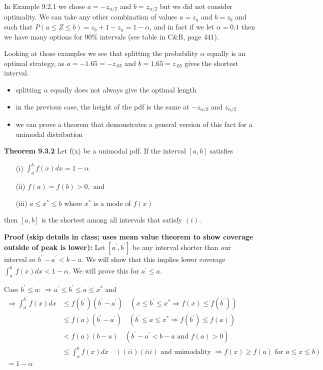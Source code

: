 \documentclass[11pt,]{article}
\begin{document}
In Example 9.2.1 we chose \(a = -z_{\alpha/2}\) and \(b = z_{\alpha/2}\)
but we did not consider optimality. We can take any other combination of
values \(a=z_{a}\) and \(b=z_{b}\) and such that
\(P(a \leq Z \leq b) = z_{b} + 1 - z_{a} = 1-\alpha\), and in fact if we
let \(\alpha = 0.1\) then we have many options for 90\% intervals (see
table in C\&B, page 441).

Looking at those examples we see that splitting the probability
\(\alpha\) equally is an optimal strategy, as \(a = -1.65 = -z_{.05}\)
and \(b=1.65 = z_{.05}\) gives the shortest interval.

\begin{itemize}
\item splitting $\alpha$ equally does not always give the optimal length
\item in the previous case, the height of the pdf is the same at $-z_{\alpha/2}$ and $z_{\alpha/2}$
\item we can prove a theorem that demonstrates a general version of this fact for a unimodal distribution
\end{itemize}

\noindent\textbf{Theorem 9.3.2} Let f(x) be a unimodal pdf. If the
interval \([a,b]\) satisfies

\begin{enumerate}
\item[(i)] $\int_{a}^{b} f(x) dx = 1-\alpha$
\item[(ii)] $f(a) = f(b) > 0,$ and
\item[(iii)] $a \leq x^* \leq b$ where $x^*$ is a mode of $f(x)$
\end{enumerate}

then \([a,b]\) is the shortest among all intervals that satisfy \((i)\).

\def\aprime{a^\prime}
\def\bprime{b^\prime}

\noindent\textbf{Proof (skip details in class; uses mean value theorem to show coverage outside of peak is lower):}
Let \([a^\prime,b^\prime]\) be any interval shorter than our interval so
\(b^\prime- a^\prime< b - a\). We will show that this implies lower
coverage \(\int_{a^\prime}^{b^\prime} f(x) dx < 1-\alpha\). We will
prove this for \(a^\prime\leq a\).

Case \(b^\prime\leq a\):
\(\Rightarrow a^\prime\leq b^\prime\leq a \leq x^{*}\) and
\begin{align*}
\Rightarrow \int_{a^\prime}^{b^\prime}f(x)dx &\leq f(b^\prime)(b^\prime-a^\prime) \quad (x \leq b^\prime\leq x^* \Rightarrow f(x) \leq f(b^\prime))\\
&\leq f(a) (b^\prime- a^\prime) \quad (b^\prime\leq a \leq x^* \Rightarrow f(b^\prime) \leq f(a))\\
&< f(a) (b-a) \quad (b^\prime- a^\prime< b-a \mbox{ and } f(a)>0)\\
& \leq \int_{a}^{b} f(x) dx \quad ((ii) (iii) \mbox{ and unimodality } \Rightarrow f(x) \geq f(a) \mbox{ for } a \leq x \leq b)\\
= 1-\alpha
\end{align*}
\end{document}
